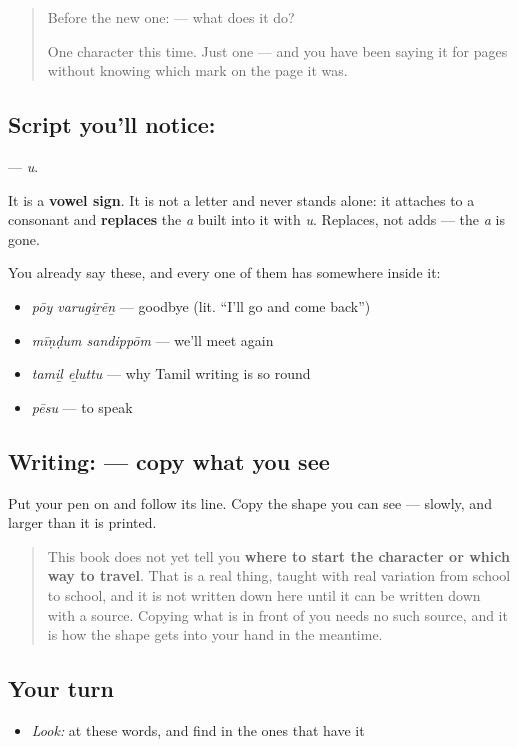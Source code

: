 \begin{quote}
Before the new one:  — what does it do?

One character this time. Just one — and you have been saying it for pages without knowing which mark on the page it was.
\end{quote}

\subsection*{Script you'll notice: }
\textbf{} — \emph{u}.

It is a \textbf{vowel sign}. It is not a letter and never stands alone: it attaches to a consonant and \textbf{replaces} the \emph{a} built into it with \emph{u}. Replaces, not adds — the \emph{a} is gone.

You already say these, and every one of them has  somewhere inside it:

\begin{itemize}
\raggedright
  \item \textbf{ } \emph{pōy varugiṟēṉ} — goodbye (lit. \textquotedblleft{}I'll go and come back\textquotedblright{})
  \item \textbf{ } \emph{mīṇḍum sandippōm} — we'll meet again
  \item \textbf{ } \emph{tamiḻ eḻuttu} — why Tamil writing is so round
  \item \textbf{} \emph{pēsu} — to speak
\end{itemize}

\subsection*{Writing:  — copy what you see}
Put your pen on  and follow its line. Copy the shape you can see — slowly, and larger than it is printed.

\begin{quote}
This book does not yet tell you \textbf{where to start the character or which way to travel}. That is a real thing, taught with real variation from school to school, and it is not written down here until it can be written down with a source. Copying what is in front of you needs no such source, and it is how the shape gets into your hand in the meantime.
\end{quote}

\subsection*{Your turn}
\begin{itemize}
\raggedright
  \item \emph{Look:} at these words, and find  in the ones that have it
\end{itemize}

